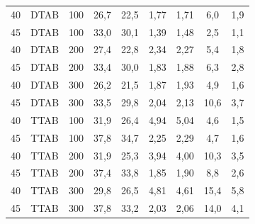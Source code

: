 \begin{table}[h]
{\begin{tabular}{ccccccccc}
			\midrule
			40     & DTAB  & 100        & 26,7     & 22,5      & 1,77     & 1,71      & 6,0      & 1,9       \\
			45     & DTAB  & 100        & 33,0     & 30,1      & 1,39     & 1,48      & 2,5      & 1,1       \\
			40     & DTAB  & 200        & 27,4     & 22,8      & 2,34     & 2,27      & 5,4      & 1,8       \\
			45     & DTAB  & 200        & 33,4     & 30,0      & 1,83     & 1,88      & 6,3      & 2,8       \\
			40     & DTAB  & 300        & 26,2     & 21,5      & 1,87     & 1,93      & 4,9      & 1,6       \\
			45     & DTAB  & 300        & 33,5     & 29,8      & 2,04     & 2,13      & 10,6     & 3,7       \\
			\midrule
			40     & TTAB  & 100        & 31,9     & 26,4      & 4,94     & 5,04      & 4,6      & 1,5       \\
			45     & TTAB  & 100        & 37,8     & 34,7      & 2,25     & 2,29      & 4,7      & 1,6       \\
			40     & TTAB  & 200        & 31,9     & 25,3      & 3,94     & 4,00      & 10,3     & 3,5       \\
			45     & TTAB  & 200        & 37,4     & 33,8      & 1,85     & 1,90      & 8,8      & 2,6       \\
			40     & TTAB  & 300        & 29,8     & 26,5      & 4,81     & 4,61      & 15,4     & 5,8       \\
			45     & TTAB  & 300        & 37,8     & 33,2      & 2,03     & 2,06      & 14,0     & 4,1       \\
            \bottomrule
            \end{tabular}}%
        {}
    \end{table}
    

